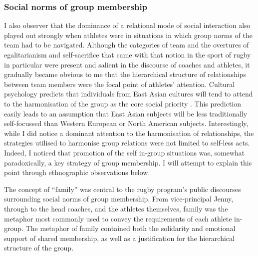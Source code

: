\begin{CJK}{UTF8}{gbsn}



      \subsubsection{Social norms of group membership}

  I also observer that the dominance of a relational mode of social interaction also played out strongly when athletes were in situations in which group norms of the team had to be navigated.  Although the categories of team and the overtures of egalitarianism and self-sacrifice that came with that notion in the sport of rugby in particular were present and salient in the discourse of coaches and athletes, it gradually became obvious to me that the hierarchical structure of relationships between team members were the focal point of athletes' attention.  Cultural psychology predicts that individuals from East Asian cultures will tend to attend to the harmonisation of the group as the core social priority \citep{Yuki2003}.  This prediction easily leads to an assumption that East Asian subjects will be less traditionally self-focussed than Western European or North American subjects.  Interestingly, while I did notice a dominant attention to the harmonisation of relationships, the strategies utilised to harmonise group relations were not limited to self-less acts.  Indeed, I noticed that promotion of the self in-group situations was, somewhat paradoxically, a key strategy of group membership.  I will attempt to explain this point through ethnographic observations below.



  The concept of ``family'' was central to the rugby program's public discourses surrounding social norms of group membership. From vice-principal Jenny, through to the head coaches, and the athletes themselves, family was the metaphor most commonly used to convey the requirements of each athlete in-group.  The metaphor of family contained both the solidarity and emotional support of shared membership, as well as a justification for the hierarchical structure of the group.


\end{CJK}
